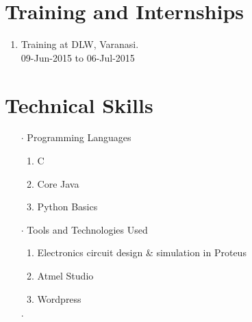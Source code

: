 \documentclass[11pt]{article}
\begin{document}
	\section*{Training and Internships}
	\begin{enumerate}
		\item Training at DLW, Varanasi.\\09-Jun-2015 to 06-Jul-2015
	\end{enumerate}
	\section*{Technical Skills}
	\begin{itemize}
		\item[$\cdot$]Programming Languages
		\begin{enumerate}
			\item C
			\item Core Java
			\item Python Basics
		\end{enumerate}
		\item[$\cdot$]Tools and Technologies Used
		\begin{enumerate}
			\item Electronics circuit design \& simulation in Proteus
			\item Atmel Studio
			\item Wordpress
		\end{enumerate}
	\end{itemize}
	\begin{itemize}
		\item[$\cdot$]
	\end{itemize}


	
\end{document}
